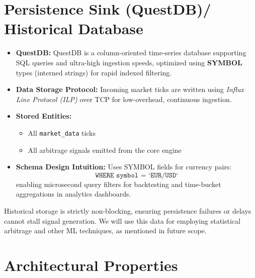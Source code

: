 \documentclass[letterpaper,11pt]{report}
\begin{document}
\section{Persistence Sink (QuestDB)/ Historical Database}

\begin{itemize}
    \item \textbf{QuestDB:}  
    QuestDB is a column-oriented time-series database supporting SQL queries and ultra-high ingestion speeds, optimized using \textbf{SYMBOL} types (interned strings) for rapid indexed filtering.

    \item \textbf{Data Storage Protocol:}  
    Incoming market ticks are written using \emph{Influx Line Protocol (ILP)} over TCP for low-overhead, continuous ingestion.

    \item \textbf{Stored Entities:}
    \begin{itemize}
        \item All \texttt{market\_data} ticks
        \item All arbitrage signals emitted from the core engine
    \end{itemize}

    \item \textbf{Schema Design Intuition:}  
    Uses SYMBOL fields for currency pairs:
    \begin{equation}
        \texttt{WHERE symbol = `EUR/USD`}
    \end{equation}  
    enabling microsecond query filters for backtesting and time-bucket aggregations in analytics dashboards.
\end{itemize}

Historical storage is strictly non-blocking, ensuring persistence failures or delays cannot stall signal generation. We will use this data for employing statistical arbitrage and other ML techniques, as mentioned in future scope.


\section{Architectural Properties}
\end{document}

